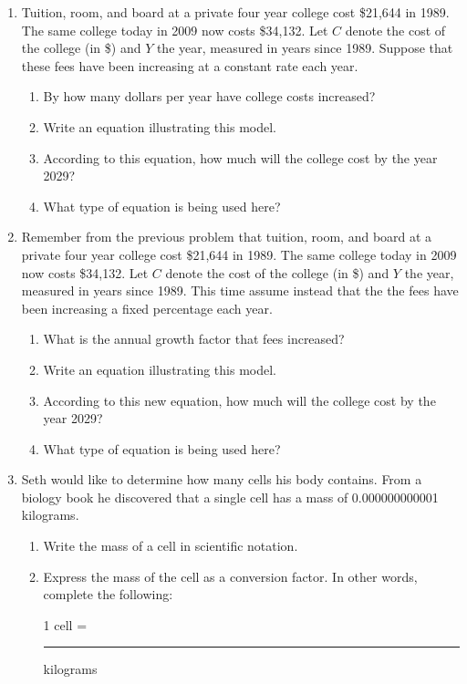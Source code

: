 \documentclass[12pt]{article}
\begin{document}
\begin{enumerate}
\newpage

\item Tuition, room, and board at a private four year college cost \$21,644 in 1989.  The same college today in 2009 now costs \$34,132.  Let $C$ denote the cost of the college (in \$) and $Y$ the year, measured in years since 1989.  Suppose that these fees have been increasing at a constant rate each year.

\begin{enumerate}
\item By how many dollars per year have college costs increased?
\vfill
\item Write an equation illustrating this model.
\vfill
\item According to this equation, how much will the college cost by the year 2029?
\vfill
\item What type of equation is being used here?
\vfill
\end{enumerate}

\newpage

\item  Remember from the previous problem that tuition, room, and board at a private four year college cost \$21,644 in 1989.  The same college today in 2009 now costs \$34,132.  Let $C$ denote the cost of the college (in \$) and $Y$ the year, measured in years since 1989.  This time assume instead that the the fees have been increasing a fixed percentage each year.

\begin{enumerate}
\item What is the annual growth factor that fees increased?  
\vfill
\item Write an equation illustrating this model.
\vfill
\item According to this new equation, how much will the college cost by the year 2029?
\vfill
\item What type of equation is being used here?
\vfill
\end{enumerate}





\newpage

\item  Seth would like to determine how many cells his body contains.  From a biology book he discovered that a single cell has a mass of 0.000000000001 kilograms.  

\begin{enumerate}
\item Write the mass of a cell in scientific notation.
\vfill
\item Express the mass of the cell as a conversion factor.  In other words, complete the following:
\vspace{0.2in}
\begin{center} 1 cell = \rule{1.5in}{.01in} kilograms \end{center}
\vspace{0.2in}


\end{enumerate}
\end{enumerate}
\end{document}
